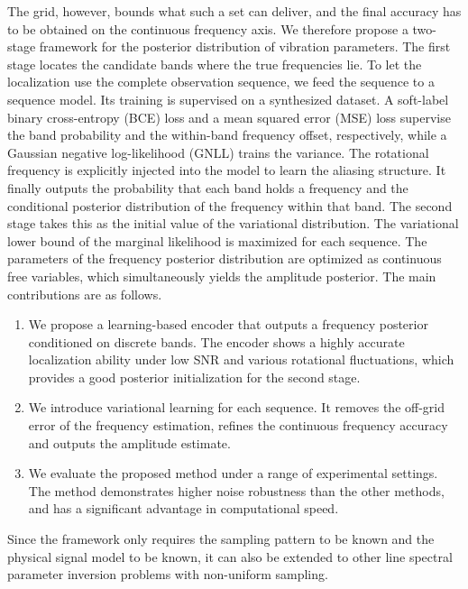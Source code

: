 \documentclass[journal,onecolumn]{IEEEtran}
\begin{document}
The grid, however, bounds what such a set can deliver, and the final accuracy has to be obtained on the continuous frequency axis. We therefore propose a two-stage framework for the posterior distribution of vibration parameters. The first stage locates the candidate bands where the true frequencies lie. To let the localization use the complete observation sequence, we feed the sequence to a sequence model. Its training is supervised on a synthesized dataset. A soft-label binary cross-entropy (BCE) loss and a mean squared error (MSE) loss supervise the band probability and the within-band frequency offset, respectively, while a Gaussian negative log-likelihood (GNLL) trains the variance. The rotational frequency is explicitly injected into the model to learn the aliasing structure. It finally outputs the probability that each band holds a frequency and the conditional posterior distribution of the frequency within that band. The second stage takes this as the initial value of the variational distribution. The variational lower bound of the marginal likelihood is maximized for each sequence. The parameters of the frequency posterior distribution are optimized as continuous free variables, which simultaneously yields the amplitude posterior. The main contributions are as follows.

\begin{enumerate}
\item We propose a learning-based encoder that outputs a frequency posterior conditioned on discrete bands. The encoder shows a highly accurate localization ability under low SNR and various rotational fluctuations, which provides a good posterior initialization for the second stage.

\item We introduce variational learning for each sequence. It removes the off-grid error of the frequency estimation, refines the continuous frequency accuracy and outputs the amplitude estimate.

\item We evaluate the proposed method under a range of experimental settings. The method demonstrates higher noise robustness than the other methods, and has a significant advantage in computational speed.
\end{enumerate}

Since the framework only requires the sampling pattern to be known and the physical signal model to be known, it can also be extended to other line spectral parameter inversion problems with non-uniform sampling.
\end{document}
